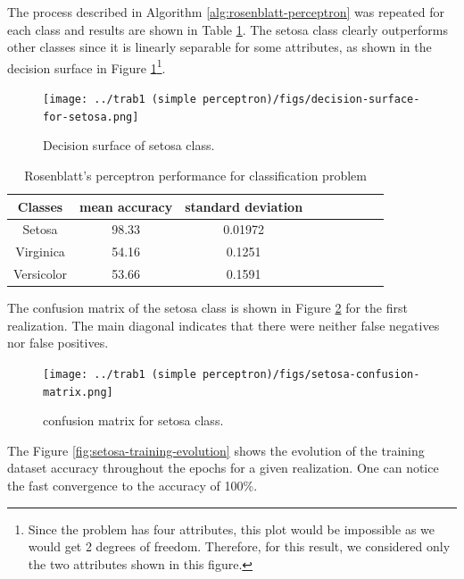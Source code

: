 \documentclass[12pt,a4paper]{article}
\begin{document}
The process described in Algorithm \ref{alg:rosenblatt-perceptron} was repeated for each class and results are shown in Table \ref{tab:rosenblatt-results}. The setosa class clearly outperforms other classes since it is linearly separable for some attributes, as shown in the decision surface in Figure \ref{fig:rosenblatt-decision-surface}\footnote{Since the problem has four attributes, this plot would be impossible as we would get 2 degrees of freedom. Therefore, for this result, we considered only the two attributes shown in this figure.}.

\begin{figure}[H]
    \centering
    \texttt{[image: ../trab1 (simple perceptron)/figs/decision-surface-for-setosa.png]}
    \caption{Decision surface of setosa class.}
    \label{fig:rosenblatt-decision-surface}
\end{figure}

\begin{table}
	\centering
	\caption{Rosenblatt's perceptron performance for classification problem}
	\footnotesize
	\setlength{\tabcolsep}{5pt}
	\begin{tabular}{ccccccccc}
		\hline
		Classes & mean accuracy & standard deviation \\
		\hline
		Setosa & 98.33 & 0.01972 \\
        \hline
		Virginica & 54.16 & 0.1251 \\
		\hline
		Versicolor & 53.66 & 0.1591 \\
		\hline
	\end{tabular} \label{tab:rosenblatt-results}
\end{table}

The confusion matrix of the setosa class is shown in Figure \ref{fig:confusion-matrix-setosa} for the first realization. The main diagonal indicates that there were neither false negatives nor false positives.

\begin{figure}[H]
    \centering
    \texttt{[image: ../trab1 (simple perceptron)/figs/setosa-confusion-matrix.png]}
    \caption{confusion matrix for setosa class.}
    \label{fig:confusion-matrix-setosa}
\end{figure}

The Figure \ref{fig:setosa-training-evolution} shows the evolution of the training dataset accuracy throughout the epochs for a given realization. One can notice the fast convergence to the accuracy of 100\%.
\end{document}
